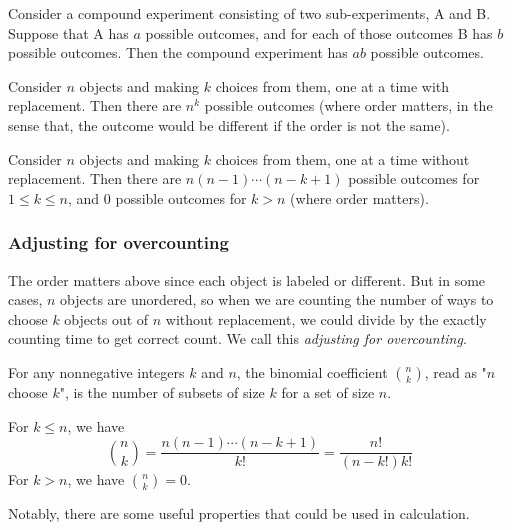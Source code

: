 \begin{thm}
    Consider a compound experiment consisting of two sub-experiments, A and B. Suppose that A has $a$ possible outcomes, and for each of those outcomes B has $b$ possible outcomes. Then the compound experiment has $ab$ possible outcomes.
\end{thm}

\begin{thm}
    Consider $n$ objects and making $k$ choices from them, one at a time with replacement. Then there are $n^k$ possible outcomes (where order matters, in the sense that, the outcome would be different if the order is not the same).
\end{thm}

\begin{thm}
    Consider $n$ objects and making $k$ choices from them, one at a time without replacement. Then there are $n(n-1)\cdots(n-k+1)$ possible outcomes for $1\leq k \leq n$, and $0$ possible outcomes for $k>n$ (where order matters).
\end{thm}

\subsubsection{Adjusting for overcounting}

The order matters above since each object is labeled or different. But in some cases, $n$ objects are unordered, so when we are counting the number of ways to choose $k$ objects out of $n$ without replacement, we could divide by the exactly counting time to get correct count. We call this \textit{adjusting for overcounting}. 

\begin{thm}
    For any nonnegative integers $k$ and $n$, the binomial coefficient $\binom{n}{k}$, read as "$n$ choose $k$", is the number of subsets of size $k$ for a set of size $n$.  
\end{thm}

\begin{defn}
    For $k\leq n$, we have
    $$
    \binom{n}{k} = \frac{n(n-1)\cdots(n-k+1)}{k!} = \frac{n!}{(n-k!)k!}
    $$
    For $k>n$, we have $\binom{n}{k}=0$.  
\end{defn}

Notably, there are some useful properties that could be used in calculation.